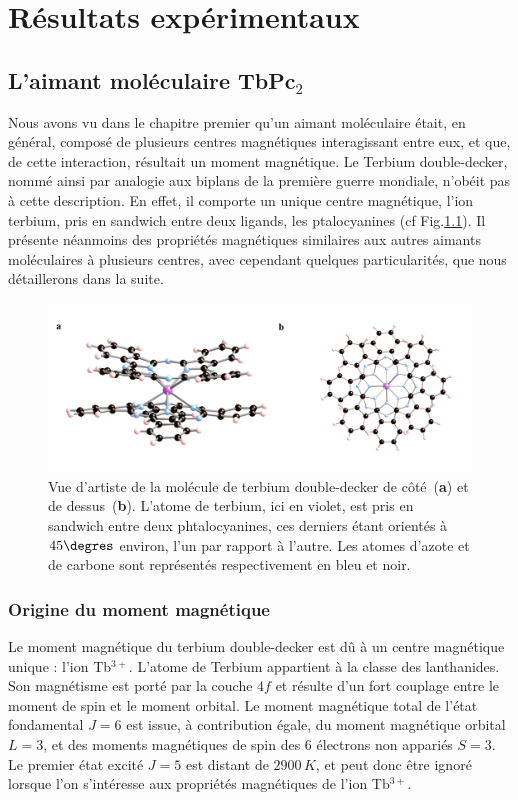 \chapter{Résultats expérimentaux}

\section{L'aimant moléculaire TbPc$_2$}
Nous avons vu dans le chapitre premier qu'un aimant moléculaire était, en général, composé de plusieurs centres magnétiques interagissant entre eux, et que, de cette interaction, résultait un moment magnétique. Le Terbium double-decker, nommé ainsi par analogie aux biplans de la première guerre mondiale, n’obéit pas à cette description. En effet, il comporte un unique centre magnétique, l'ion terbium, pris en sandwich entre deux ligands, les ptalocyanines (cf Fig.\ref{TbPc2Imag}). Il présente néanmoins des propriétés magnétiques similaires aux autres aimants moléculaires à plusieurs centres, avec cependant quelques particularités, que nous détaillerons dans la suite.

\begin{figure}
\centering \includegraphics[scale=0.45]{Resultats/TbPc2Imag/TbPc2Imag.pdf} 
\caption{Vue d'artiste de la molécule de terbium double-decker de côté~(\textbf{a}) et de dessus~(\textbf{b}). L'atome de terbium, ici en violet, est pris en sandwich entre deux phtalocyanines, ces derniers étant orientés à $45\degres$ environ, l'un par rapport à l'autre. Les atomes d'azote et de carbone sont représentés respectivement en bleu et noir.}
\label{TbPc2Imag}
\end{figure}





\subsection{Origine du moment magnétique}
Le moment magnétique du terbium double-decker est d\^u à un centre magnétique unique : l'ion Tb$^{3+}$. L'atome de Terbium appartient à la classe des lanthanides. Son magnétisme est porté par la couche $4f$ et résulte d'un fort couplage entre le moment de spin et le moment orbital. Le moment magnétique total de l'état fondamental $J=6$ est issue, à contribution égale, du moment magnétique orbital $L=3$, et des moments magnétiques de spin des 6 électrons non appariés $S=3$. Le premier état excité $J=5$ est distant de $2900\,K$, et peut donc \^etre ignoré lorsque l'on s'intéresse aux propriétés magnétiques de l'ion Tb$^{3+}$.
 

